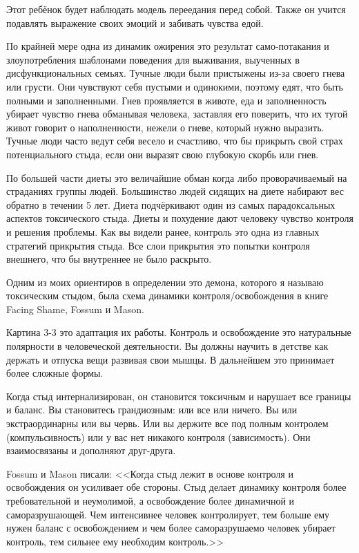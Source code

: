 \documentclass[10pt, fleqn]{article}
\begin{document}
Этот ребёнок будет наблюдать модель переедания перед собой. Также он учится подавлять выражение своих эмоций и забивать чувства едой.

По крайней мере одна из динамик ожирения это результат само-потакания и злоупотребления шаблонами поведения для выживания, выученных в дисфункциональных семьях. Тучные люди были пристыжены из-за своего гнева или грусти. Они чувствуют себя пустыми и одинокими, поэтому едят, что быть полными и заполненными. Гнев проявляется в животе, еда и заполненность убирает чувство гнева обманывая человека, заставляя его поверить, что их тугой живот говорит о наполненности, нежели о гневе, который нужно выразить. Тучные люди часто ведут себя весело и счастливо, что бы прикрыть свой страх потенциального стыда, если они выразят свою глубокую скорбь или гнев.

По большей части диеты это величайшие обман когда либо проворачиваемый на страданиях группы людей. Большинство людей сидящих на диете набирают вес обратно в течении 5 лет. Диета подчёркивают один из самых парадоксальных аспектов токсического стыда. Диеты и похудение дают человеку чувство контроля и решения проблемы. Как вы видели ранее, контроль это одна из главных стратегий прикрытия стыда. Все слои прикрытия это попытки контроля внешнего, что бы внутреннее не было раскрыто.

Одним из моих ориентиров в определении это демона, которого я называю токсическим стыдом, была схема динамики контроля/освобождения в книге Facing Shame, Fossum и Mason.

Картина 3-3 это адаптация их работы. Контроль и освобождение это натуральные полярности в человеческой деятельности. Вы должны научить в детстве как держать и отпуска вещи развивая свои мышцы. В дальнейшем это принимает более сложные формы.

Когда стыд интернализирован, он становится токсичным и нарушает все границы и баланс. Вы становитесь грандиозным: или все или ничего. Вы или экстраординарны или вы червь. Или вы держите все под полным контролем (компульсивность) или у вас нет никакого контроля (зависимость). Они взаимосвязаны и дополняют друг-друга.

Fossum и Mason писали:
<<Когда стыд лежит в основе контроля и освобождения он усиливает обе стороны. Стыд делает динамику контроля более требовательной и неумолимой, а освобождение более динамичной и саморазрушающей. Чем интенсивнее человек контролирует, тем больше ему нужен баланс с освобождением и чем более саморазрушаемо человек убирает контроль, тем сильнее ему необходим контроль.>>
\end{document}
